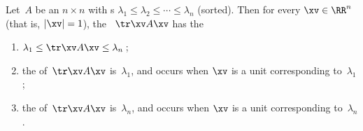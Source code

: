 \begin{theorem}%
\label{thm:optqform}
Let~\(A\) be an \(n\times n\)  with s \(\lambda_1\leq\lambda_2\leq\cdots\leq\lambda_n\) (sorted). 
Then for every  \(\xv\in\RR^n\) (that is, \(|\xv|=1\)), the ~\(\tr\xv A\xv\) has the 
\begin{enumerate}
\item \(\lambda_1\leq \tr\xv A\xv\leq\lambda_n\)\,;
\item the  of~\(\tr\xv A\xv\) is~\(\lambda_1\), and occurs when \(\xv\) is a unit  corresponding to~\(\lambda_1\);
\item the  of~\(\tr\xv A\xv\) is~\(\lambda_n\), and occurs when \(\xv\) is a unit  corresponding to~\(\lambda_n\).
\end{enumerate}
\end{theorem}

